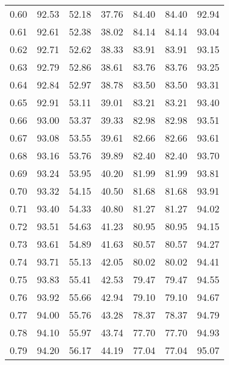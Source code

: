 \begin{tabular}{|c|c|c|c|c|c|c|}
      0.60 &     92.53 &     52.18 &      37.76 &   84.40 &      84.40 &         92.94 \\
      0.61 &     92.61 &     52.38 &      38.02 &   84.14 &      84.14 &         93.04 \\
      0.62 &     92.71 &     52.62 &      38.33 &   83.91 &      83.91 &         93.15 \\
      0.63 &     92.79 &     52.86 &      38.61 &   83.76 &      83.76 &         93.25 \\
      0.64 &     92.84 &     52.97 &      38.78 &   83.50 &      83.50 &         93.31 \\
      0.65 &     92.91 &     53.11 &      39.01 &   83.21 &      83.21 &         93.40 \\
      0.66 &     93.00 &     53.37 &      39.33 &   82.98 &      82.98 &         93.51 \\
      0.67 &     93.08 &     53.55 &      39.61 &   82.66 &      82.66 &         93.61 \\
      0.68 &     93.16 &     53.76 &      39.89 &   82.40 &      82.40 &         93.70 \\
      0.69 &     93.24 &     53.95 &      40.20 &   81.99 &      81.99 &         93.81 \\
      0.70 &     93.32 &     54.15 &      40.50 &   81.68 &      81.68 &         93.91 \\
      0.71 &     93.40 &     54.33 &      40.80 &   81.27 &      81.27 &         94.02 \\
      0.72 &     93.51 &     54.63 &      41.23 &   80.95 &      80.95 &         94.15 \\
      0.73 &     93.61 &     54.89 &      41.63 &   80.57 &      80.57 &         94.27 \\
      0.74 &     93.71 &     55.13 &      42.05 &   80.02 &      80.02 &         94.41 \\
      0.75 &     93.83 &     55.41 &      42.53 &   79.47 &      79.47 &         94.55 \\
      0.76 &     93.92 &     55.66 &      42.94 &   79.10 &      79.10 &         94.67 \\
      0.77 &     94.00 &     55.76 &      43.28 &   78.37 &      78.37 &         94.79 \\
      0.78 &     94.10 &     55.97 &      43.74 &   77.70 &      77.70 &         94.93 \\
      0.79 &     94.20 &     56.17 &      44.19 &   77.04 &      77.04 &         95.07 \\

\end{tabular}
